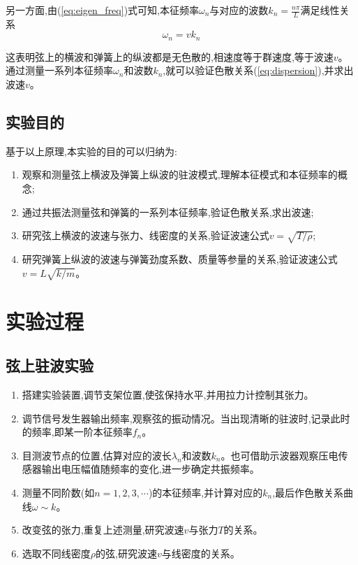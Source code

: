 \documentclass[UTF8]{ctexart}
\begin{document}
另一方面,由(\ref{eq:eigen_freq})式可知,本征频率$\omega_n$与对应的波数$k_n=\frac{n\pi}{L}$满足线性关系
\begin{equation}
\omega_n = vk_n
\label{eq:dispersion}
\end{equation}

这表明弦上的横波和弹簧上的纵波都是无色散的,相速度等于群速度,等于波速$v$。通过测量一系列本征频率$\omega_n$和波数$k_n$,就可以验证色散关系(\ref{eq:dispersion}),并求出波速$v$。

\subsection{实验目的}

基于以上原理,本实验的目的可以归纳为:
\begin{enumerate}
\item 观察和测量弦上横波及弹簧上纵波的驻波模式,理解本征模式和本征频率的概念;
\item 通过共振法测量弦和弹簧的一系列本征频率,验证色散关系,求出波速;
\item 研究弦上横波的波速与张力、线密度的关系,验证波速公式$v=\sqrt{T/\rho}$;
\item 研究弹簧上纵波的波速与弹簧劲度系数、质量等参量的关系,验证波速公式$v=L\sqrt{k/m}$。
\end{enumerate}

\section{实验过程}
\subsection{弦上驻波实验}
\begin{enumerate}
\item 搭建实验装置,调节支架位置,使弦保持水平,并用拉力计控制其张力。
\item 调节信号发生器输出频率,观察弦的振动情况。当出现清晰的驻波时,记录此时的频率,即某一阶本征频率$f_n$。
\item 目测波节点的位置,估算对应的波长$\lambda_n$和波数$k_n$。也可借助示波器观察压电传感器输出电压幅值随频率的变化,进一步确定共振频率。
\item 测量不同阶数(如$n=1,2,3,\cdots$)的本征频率,并计算对应的$k_n$,最后作色散关系曲线$\omega \sim k$。
\item 改变弦的张力,重复上述测量,研究波速$v$与张力$T$的关系。
\item 选取不同线密度$\rho$的弦,研究波速$v$与线密度的关系。
\end{enumerate}
\end{document}
